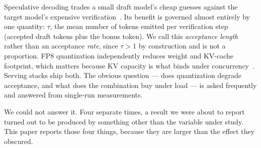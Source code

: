\documentclass[11pt]{article}
\begin{document}
Speculative decoding trades a small draft model's cheap guesses against the
target model's expensive verification~\cite{leviathan2023,chen2023}. Its
benefit is governed almost entirely by one quantity: $\tau$, the mean number
of tokens emitted per verification step (accepted draft tokens plus the
bonus token). We call this \emph{acceptance length} rather than an
acceptance \emph{rate}, since $\tau > 1$ by construction and is not a
proportion. FP8 quantization independently
reduces weight and KV-cache footprint, which matters because KV capacity is
what binds under concurrency~\cite{kwon2023}. Serving stacks ship both. The
obvious question --- does quantization degrade acceptance, and what does the
combination buy under load --- is asked frequently and answered from
single-run measurements.

We could not answer it. Four separate times, a result we were about to
report turned out to be produced by something other than the variable under
study. This paper reports those four things, because they are larger than
the effect they obscured.
\end{document}
